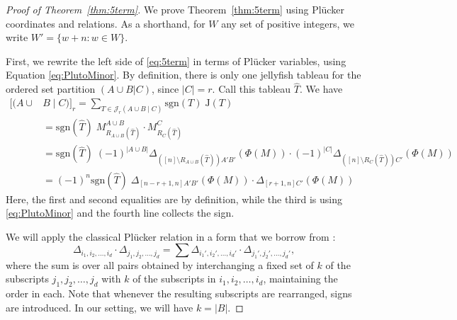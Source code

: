 \documentclass[10pt]{amsart}
\theoremstyle{definition}
\theoremstyle{plain}
\theoremstyle{plain}
\theoremstyle{definition}
\theoremstyle{remark}
\theoremstyle{plain}
\theoremstyle{plain}
\theoremstyle{plain}
\numberwithin{equation}{section}
\newcommand{\rstab}{\mathcal{J}}
\newcommand{\rspoly}{\mathrm{J}}
\newcommand{\sgn}{\mathrm{sgn}}
\begin{document}
\begin{proof}[Proof of Theorem~\ref{thm:5term}]
        We prove Theorem~\ref{thm:5term} using Pl\"ucker coordinates and relations. As a shorthand, for $W$ any set of positive integers, we write $W' = \{w + n : w \in W\}$.
        
    First, we rewrite the left side of \eqref{eq:5term} in terms of Pl\"ucker variables, using Equation \eqref{eq:PlutoMinor}.  By definition, there is only one jellyfish tableau for the ordered set partition $(A\cup B | C)$, since $|C|=r$. Call this tableau $\widehat{T}$.
    We have
    \begin{equation}\label{eq:expand_the_jellyfish_inv}
    \begin{split}
            \big[(A\cup & B \mid C)\big]_r = \sum_{T\in \rstab_r(A\cup B \mid C)}\sgn(T) \; \rspoly(T)  \\
          &=  \sgn(\widehat{T}) \;  M_{R_{A \cup B}(\widehat{T})}^{A \cup B} \cdot M_{R_C(\widehat{T})}^{C} \\
          &=  \sgn(\widehat{T}) \; (-1)^{|A \cup B|} \Delta_{([n]\setminus R_{A \cup B}(\widehat{T}))  A' B'}(\Phi(M)) \cdot (-1)^{|C|}\Delta_{([n]\setminus R_C(\widehat{T}))  C'}(\Phi(M))\\
          &= (-1)^n \sgn(\widehat{T}) \;  \Delta_{[n-r + 1, n]  A' B'}(\Phi(M)) \cdot \Delta_{[r+1, n]  C'}(\Phi(M))
    \end{split}
      \end{equation}
Here, the first and second equalities are by definition, while the third is using \eqref{eq:PlutoMinor} and the fourth line collects the sign.

We will apply the classical Pl\"ucker relation in a form that we borrow from \cite[Eqn.~9.1]{Fulton:YoungTableaux}:
\begin{equation}\label{eq:Fulton}
\Delta_{i_1,i_2,\ldots,i_d}\cdot\Delta_{j_1,j_2,\ldots,j_d}=\sum\Delta_{i_1',i_2',\ldots,i_d'}\cdot\Delta_{j_1',j_2',\ldots,j_d'},
\end{equation}
where the sum is over all pairs obtained by interchanging a fixed set of $k$ of the subscripts $j_1,j_2,\ldots,j_d$ with $k$ of the subscripts in $i_1,i_2,\ldots,i_d$, maintaining the order in each. Note that whenever the resulting subscripts are rearranged, signs are introduced. In our setting, we will have $k = |B|$. 


\end{proof}
\end{document}
